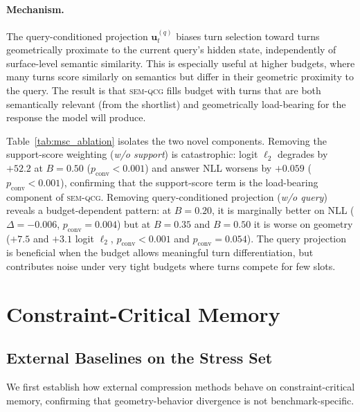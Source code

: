 \documentclass[11pt]{article}
\newcommand{\semqcg}{\textsc{sem-qcg}}
\newcommand{\uv}{\mathbf{u}}
\begin{document}
\paragraph{Mechanism.}
The query-conditioned projection $\uv_t^{(q)}$ biases turn selection toward
turns geometrically proximate to the current query's hidden state,
independently of surface-level semantic similarity.
This is especially useful at higher budgets, where many turns score
similarly on semantics but differ in their geometric proximity to the query.
The result is that \semqcg{} fills budget with turns that are both
semantically relevant (from the shortlist) and geometrically load-bearing
for the response the model will produce.

Table~\ref{tab:msc_ablation} isolates the two novel components.
Removing the support-score weighting (\textit{w/o support}) is catastrophic:
logit $\ell_2$ degrades by $+52.2$ at $B{=}0.50$ ($p_\text{conv} < 0.001$)
and answer NLL worsens by $+0.059$ ($p_\text{conv} < 0.001$),
confirming that the support-score term is the load-bearing component of \semqcg{}.
Removing query-conditioned projection (\textit{w/o query}) reveals a budget-dependent
pattern: at $B{=}0.20$, it is marginally better on NLL ($\Delta{=}{-}0.006$,
$p_\text{conv}{=}0.004$) but at $B{=}0.35$ and $B{=}0.50$ it is worse on geometry
($+7.5$ and $+3.1$ logit $\ell_2$, $p_\text{conv}{<}0.001$ and $p_\text{conv}{=}0.054$).
The query projection is beneficial when the budget allows meaningful turn differentiation,
but contributes noise under very tight budgets where turns compete for few slots.

\section{Constraint-Critical Memory}
\label{sec:hardset}

\subsection{External Baselines on the Stress Set}

We first establish how external compression methods behave on constraint-critical
memory, confirming that geometry-behavior divergence is not benchmark-specific.
\end{document}
